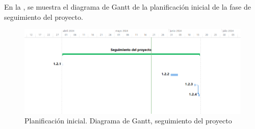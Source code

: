 En la , se muestra el diagrama de Gantt de la planificación inicial de la fase de seguimiento del proyecto.
\begin{figure}[H]
    \hypertarget{fig:5_PI-Gantt-Seguimiento}{}
    \centering
    \includegraphics[width=1\linewidth]{figures/5-Gantt/5-Gantt-Seguimiento.png}
    \caption{Planificación inicial. Diagrama de Gantt, seguimiento del proyecto}
    \label{fig:5_PI-Gantt-Seguimiento}
\end{figure}



